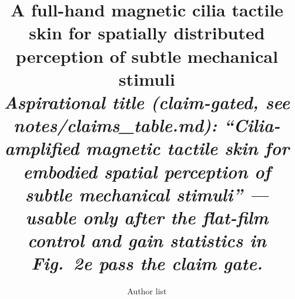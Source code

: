 \documentclass[11pt]{article}
\title{\textbf{A full-hand magnetic cilia tactile skin for spatially
distributed perception of subtle mechanical stimuli}\\[6pt]
\normalsize\textit{Aspirational title (claim-gated, see notes/claims\_table.md):
``Cilia-amplified magnetic tactile skin for embodied spatial perception of
subtle mechanical stimuli'' --- usable only after the flat-film control and
gain statistics in Fig.~2e pass the claim gate.}}
\author{Author list \dataneeded{authors} \\[2pt]
\normalsize \dataneeded{affiliations}}
\date{}
\begin{document}
\maketitle
\linenumbers
\onehalfspacing







\clearpage


\clearpage

\clearpage

\end{document}
